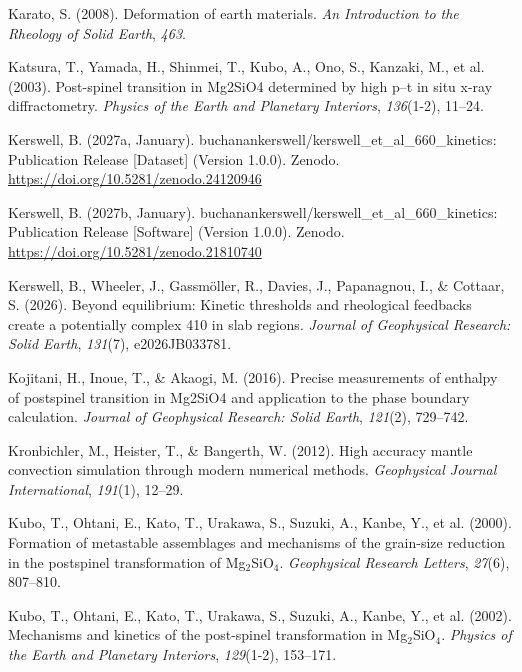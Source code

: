 \documentclass[draft,linenumbers]{agujournal2019}
\newlength{\cslhangindent}
\newenvironment{CSLReferences}[2]
 {\begin{list}{}{
  \setlength{\itemindent}{0pt}
  \setlength{\leftmargin}{0pt}
  \setlength{\parsep}{0pt}
  \ifodd #1
   \setlength{\leftmargin}{\cslhangindent}
   \setlength{\itemindent}{-\cslhangindent}
  \fi
  \setlength{\itemsep}{#2\baselineskip}
  }
  \item\relax}
 {\end{list}}
\begin{document}
\begin{CSLReferences}{1}{0}
Karato, S. (2008). Deformation of earth materials. \emph{An Introduction
to the Rheology of Solid Earth}, \emph{463}.

{Katsura, T., Yamada, H., Shinmei, T., Kubo, A., Ono, S., Kanzaki, M.,
et al.} (2003). Post-spinel transition in Mg2SiO4 determined by high
p--t in situ x-ray diffractometry. \emph{Physics of the Earth and
Planetary Interiors}, \emph{136}(1-2), 11--24.

Kerswell, B. (2027a, January).
{buchanankerswell/kerswell\_et\_al\_660\_kinetics: Publication Release
{[}Dataset{]}} (Version 1.0.0). Zenodo.
\url{https://doi.org/10.5281/zenodo.24120946}

Kerswell, B. (2027b, January).
{buchanankerswell/kerswell\_et\_al\_660\_kinetics: Publication Release
{[}Software{]}} (Version 1.0.0). Zenodo.
\url{https://doi.org/10.5281/zenodo.21810740}

Kerswell, B., Wheeler, J., Gassmöller, R., Davies, J., Papanagnou, I.,
\& Cottaar, S. (2026). Beyond equilibrium: Kinetic thresholds and
rheological feedbacks create a potentially complex 410 in slab regions.
\emph{Journal of Geophysical Research: Solid Earth}, \emph{131}(7),
e2026JB033781.

Kojitani, H., Inoue, T., \& Akaogi, M. (2016). Precise measurements of
enthalpy of postspinel transition in Mg2SiO4 and application to the
phase boundary calculation. \emph{Journal of Geophysical Research: Solid
Earth}, \emph{121}(2), 729--742.

Kronbichler, M., Heister, T., \& Bangerth, W. (2012). High accuracy
mantle convection simulation through modern numerical methods.
\emph{Geophysical Journal International}, \emph{191}(1), 12--29.

Kubo, T., Ohtani, E., Kato, T., Urakawa, S., Suzuki, A., Kanbe, Y., et
al. (2000). Formation of metastable assemblages and mechanisms of the
grain-size reduction in the postspinel transformation of
{Mg\(_2\)SiO\(_4\)}. \emph{Geophysical Research Letters}, \emph{27}(6),
807--810.

Kubo, T., Ohtani, E., Kato, T., Urakawa, S., Suzuki, A., Kanbe, Y., et
al. (2002). Mechanisms and kinetics of the post-spinel transformation in
{Mg\(_2\)SiO\(_4\)}. \emph{Physics of the Earth and Planetary
Interiors}, \emph{129}(1-2), 153--171.


\end{CSLReferences}
\end{document}
